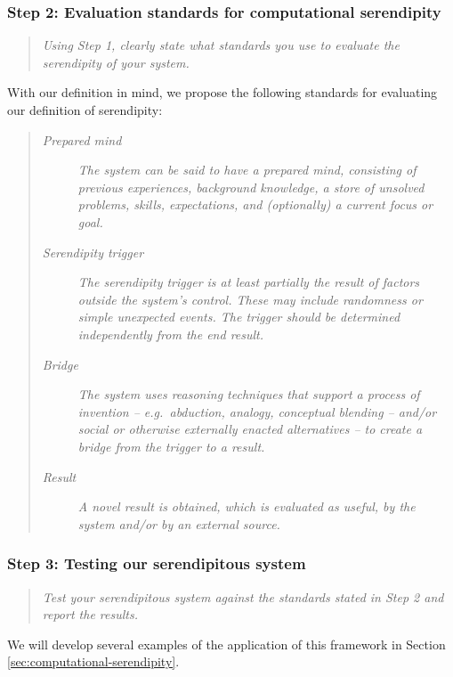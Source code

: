 \subsubsection*{ Step 2: Evaluation standards for computational serendipity}
\begin{quote} {\em Using Step 1, clearly state what standards you use to evaluate the serendipity of your
    system. }\end{quote}

With our definition in mind, we propose the following standards for evaluating our definition of
serendipity:

\begin{quote}
\begin{description}
\item[\emph{Prepared mind}] \emph{The system can be said to have a
  prepared mind, consisting of previous experiences, background
  knowledge, a store of unsolved problems, skills, expectations, and
  (optionally) a current focus or goal.}
\item[\emph{Serendipity trigger}] \emph{The serendipity trigger is at
  least partially the result of factors outside the system's control.
  These may include randomness or simple unexpected events.  The
  trigger should be determined independently from the end result.}
\item[\emph{Bridge}] \emph{The system uses reasoning techniques
  that support a process of invention -- e.g.~abduction, analogy,
  conceptual blending -- and/or social or otherwise externally enacted
  alternatives -- to create a bridge from the trigger to a result.}
\item[\emph{Result}] \emph{A novel result is obtained, which is
  evaluated as useful, by the system and/or by an external source.}
\end{description}
\end{quote}

\subsubsection*{Step 3: Testing our serendipitous system}

\begin{quote} {\em Test your serendipitous system against the standards stated in Step 2 and report the
results.}\end{quote}

We will develop several examples of the application of this framework
in Section \ref{sec:computational-serendipity}.

